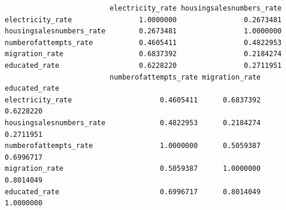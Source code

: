 \documentclass[
  11pt,
  a4paper,
  DIV=11,
  numbers=noendperiod]{scrartcl}
\begin{document}
\begin{verbatim}
                         electricity_rate housingsalesnumbers_rate
electricity_rate                1.0000000                0.2673481
housingsalesnumbers_rate        0.2673481                1.0000000
numberofattempts_rate           0.4605411                0.4822953
migration_rate                  0.6837392                0.2184274
educated_rate                   0.6228220                0.2711951
                         numberofattempts_rate migration_rate educated_rate
electricity_rate                     0.4605411      0.6837392     0.6228220
housingsalesnumbers_rate             0.4822953      0.2184274     0.2711951
numberofattempts_rate                1.0000000      0.5059387     0.6996717
migration_rate                       0.5059387      1.0000000     0.8014049
educated_rate                        0.6996717      0.8014049     1.0000000
\end{verbatim}
\end{document}
